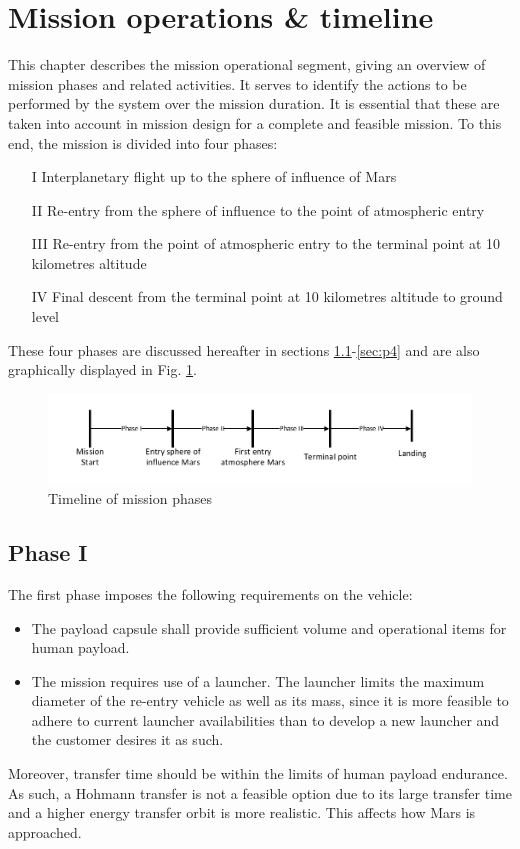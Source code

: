 \section{Mission operations \& timeline}\label{cha:opseg}
This chapter describes the mission operational segment, giving an overview of mission phases and related activities. It serves to identify the actions to be performed by the system over the mission duration. It is essential that these are taken into account in mission design for a complete and feasible mission. To this end, the mission is divided into four phases: 
\begin{itemize}
\item[I]{Interplanetary flight up to the sphere of influence of Mars}
\item[II]{Re-entry from the sphere of influence to the point of atmospheric entry}
\item[III]{Re-entry from the point of atmospheric entry to the terminal point at 10 kilometres altitude}
\item[IV]{Final descent from the terminal point at 10 kilometres altitude to ground level}
\end{itemize}
These four phases are discussed hereafter in sections \ref{sec:p1}-\ref{sec:p4} and are also graphically displayed in Fig. \ref{fig:time}.

\begin{figure}[H]
\centering
\includegraphics[width = 1.0\textwidth]{Figure/OPS.pdf}
\caption{Timeline of mission phases}
\label{fig:time}
\end{figure}

\subsection{Phase I}\label{sec:p1}
The first phase imposes the following requirements on the vehicle:
\begin{itemize}
\item The payload capsule shall provide sufficient volume and operational items for human payload. %
\item  The mission requires use of a launcher. The launcher limits the maximum diameter of the re-entry vehicle as well as its mass, since it is more feasible to adhere to current launcher availabilities than to develop a new launcher and the customer desires it as such.
\end{itemize}
Moreover, transfer time should be within the limits of human payload endurance. As such, a Hohmann transfer is not a feasible option due to its large transfer time and a higher energy transfer orbit is more realistic. This affects how Mars is approached.

